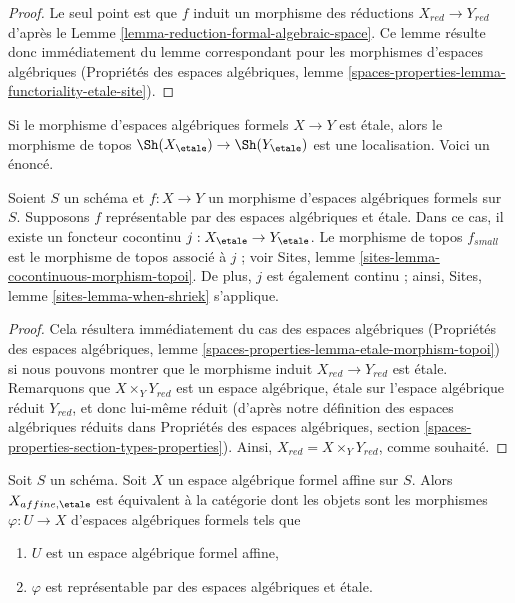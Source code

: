 \begin{proof}
Le seul point est que $f$ induit un morphisme des réductions
$X_{red} \to Y_{red}$ d'après le Lemme \ref{lemma-reduction-formal-algebraic-space}.
Ce lemme résulte donc immédiatement du lemme correspondant pour les
morphismes d'espaces algébriques (Propriétés des espaces algébriques,
lemme \ref{spaces-properties-lemma-functoriality-etale-site}).
\end{proof}

\noindent
Si le morphisme d'espaces algébriques formels $X \to Y$ est \'etale,
alors le morphisme de topos $\Sh(X_\etale) \to \Sh(Y_\etale)$
est une localisation. Voici un énoncé.

\begin{lemma}
\label{lemma-etale-morphism-topoi}
Soient $S$ un schéma et $f : X \to Y$ un morphisme
d'espaces algébriques formels sur $S$. Supposons $f$ représentable
par des espaces algébriques et \'etale. Dans ce cas, il existe un
foncteur cocontinu $j : X_\etale \to Y_\etale$.
Le morphisme de topos $f_{small}$ est le
morphisme de topos associé à $j$ ; voir
Sites, lemme \ref{sites-lemma-cocontinuous-morphism-topoi}.
De plus, $j$ est également continu ; ainsi,
Sites, lemme \ref{sites-lemma-when-shriek} s'applique.
\end{lemma}

\begin{proof}
Cela résultera immédiatement du cas des espaces algébriques
(Propriétés des espaces algébriques, lemme
\ref{spaces-properties-lemma-etale-morphism-topoi})
si nous pouvons montrer que le morphisme induit $X_{red} \to Y_{red}$
est \'etale. Remarquons que $X \times_Y Y_{red}$ est un
espace algébrique, \'etale sur l'espace algébrique réduit $Y_{red}$,
et donc lui-même réduit (d'après notre définition des espaces algébriques
réduits dans Propriétés des espaces algébriques, section
\ref{spaces-properties-section-types-properties}).
Ainsi, $X_{red} = X \times_Y Y_{red}$, comme souhaité.
\end{proof}

\begin{lemma}
\label{lemma-affine-identify-affine-etale}
Soit $S$ un schéma. Soit $X$ un espace algébrique formel affine sur $S$.
Alors $X_{affine, \etale}$ est équivalent à la catégorie dont les objets
sont les morphismes $\varphi : U \to X$ d'espaces algébriques formels tels que
\begin{enumerate}
\item $U$ est un espace algébrique formel affine,
\item $\varphi$ est représentable par des espaces algébriques et \'etale.
\end{enumerate}
\end{lemma}

